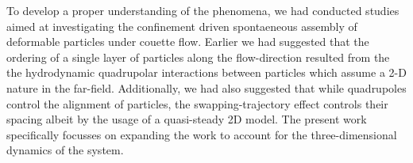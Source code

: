 To develop a proper understanding of the phenomena, we had conducted studies aimed at investigating the confinement driven spontaeneous assembly of deformable particles under couette flow. Earlier we had suggested that the ordering of a  single layer of particles along the flow-direction resulted from the the hydrodynamic quadrupolar interactions between particles which assume a 2-D nature in the far-field\cite{Reference32}. Additionally, we had also suggested that while quadrupoles control the alignment of particles, the swapping-trajectory effect\cite{Reference27} controls their spacing albeit by the usage of a quasi-steady 2D model\cite{Reference33}. The present work specifically focusses on expanding the work to account for the three-dimensional dynamics of the system. 





